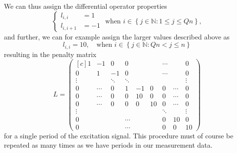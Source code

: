 \documentclass[12pt,a4]{article}
\newcommand{\N}{{\mathbb N}}
\begin{document}
We can thus assign the differential operator properties
\begin{equation*}
\begin{cases}
 l_{i,i}   &= 1 \\
 l_{i,i+1} &= -1 
\end{cases}
\text{ when } i \in \left\{ j \in \N : 1 \leq j \leq Qn \right\} ,
\end{equation*}
and further, we can for example assign the larger values described above as
\begin{equation*}
 l_{i,i} = 10, \quad \text{when } i \in \left\{ j \in \N : Qn < j \leq n \right\}
\end{equation*}
resulting in the penalty matrix
\begin{equation}
L=
\begin{pmatrix*}[c]
 1      & -1     &  0     & 0       &    &    & \cdots  &        & 0       \\
 0      & 1      & -1     & 0       &    &    & \cdots  &        & 0       \\
 \vdots &        & \ddots & \ddots  &    &    &         &        & \vdots  \\
 0      & \cdots &  0     & 1       & -1 & 0  & 0       & \cdots & 0       \\
 0      & \cdots &  0     & 0       & 10 & 0  & 0       & \cdots & 0       \\
 0      & \cdots &  0     & 0       & 0  & 10 & 0       & \cdots & 0       \\
 \vdots &        &        &         &    &    & \ddots  &        & \vdots  \\
 0      &        &        & \cdots  &    &    &  0      &  10    & 0       \\
 0      &        &        & \cdots  &    &    &  0      &  0     & 10 
\end{pmatrix*}
\end{equation}
for a single period of the excitation signal. This procedure must of course be repeated as many times as we have periods in our measurement data.
\end{document}
